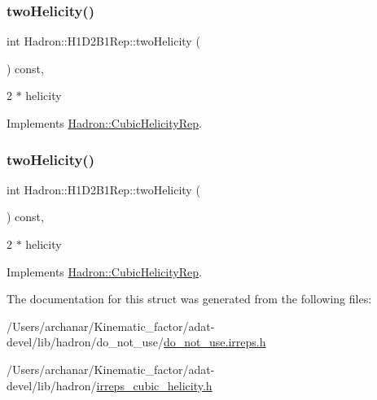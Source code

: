 \subsubsection{\texorpdfstring{twoHelicity()}{twoHelicity()}\hspace{0.1cm}{\footnotesize\ttfamily [2/3]}}
{\footnotesize\ttfamily int Hadron\+::\+H1\+D2\+B1\+Rep\+::two\+Helicity (\begin{DoxyParamCaption}{ }\end{DoxyParamCaption}) const\hspace{0.3cm}{\ttfamily [inline]}, {\ttfamily [virtual]}}

2 $\ast$ helicity 

Implements \mbox{\hyperlink{structHadron_1_1CubicHelicityRep_af507aa56fc2747eacc8cb6c96db31ecc}{Hadron\+::\+Cubic\+Helicity\+Rep}}.

\mbox{\label{structHadron_1_1H1D2B1Rep_a3cc2db9e517e6a40e7205a5dbc9b32c9}} 
\subsubsection{\texorpdfstring{twoHelicity()}{twoHelicity()}\hspace{0.1cm}{\footnotesize\ttfamily [3/3]}}
{\footnotesize\ttfamily int Hadron\+::\+H1\+D2\+B1\+Rep\+::two\+Helicity (\begin{DoxyParamCaption}{ }\end{DoxyParamCaption}) const\hspace{0.3cm}{\ttfamily [inline]}, {\ttfamily [virtual]}}

2 $\ast$ helicity 

Implements \mbox{\hyperlink{structHadron_1_1CubicHelicityRep_af507aa56fc2747eacc8cb6c96db31ecc}{Hadron\+::\+Cubic\+Helicity\+Rep}}.



The documentation for this struct was generated from the following files\+:\begin{DoxyCompactItemize}
\item 
/\+Users/archanar/\+Kinematic\+\_\+factor/adat-\/devel/lib/hadron/do\+\_\+not\+\_\+use/\mbox{\hyperlink{adat-devel_2lib_2hadron_2do__not__use_2do__not__use_8irreps_8h}{do\+\_\+not\+\_\+use.\+irreps.\+h}}\item 
/\+Users/archanar/\+Kinematic\+\_\+factor/adat-\/devel/lib/hadron/\mbox{\hyperlink{adat-devel_2lib_2hadron_2irreps__cubic__helicity_8h}{irreps\+\_\+cubic\+\_\+helicity.\+h}}\end{DoxyCompactItemize}

